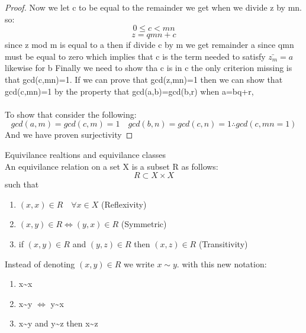 \documentclass[11pt]{article}
\theoremstyle{definition}  %
\begin{document}
\begin{proof}
Now we let c to be equal to the remainder we get when we divide z by mn. so:
\[
  0\leq c <mn
\]
\[
  z=qmn+c
\]
since z mod m is equal to a then if divide c by m we get  remainder a since qmn must be equal to zero which implies that c is the term needed to satisfy $\bar{z_m}=a$ likewise for b
Finally we need to show tha c is in c the only criterion missing is that gcd(c,mn)=1.
If we can prove that gcd(z,mn)=1 then we can show that gcd(c,mn)=1 by the property that gcd(a,b)=gcd(b,r) when a=bq+r,\\\\
To show that consider the following:
\[
  gcd(a,m)=gcd(c,m)=1\quad  gcd(b,n)=gcd(c,n)=1 \therefore gcd(c,mn=1)
\]
And we have proven surjectivity



\end{proof}

 Equivilance realtions and equivilance classes\\
An equivilance relation on a set X is a subset R as follows:
\[
  R\subset X \times X
\]
such that
\begin{enumerate}
  \item $(x,x)\in R \quad \forall x\in X$ (Reflexivity)
  \item $(x,y)\in R \iff (y,x)\in R$ (Symmetric)
  \item if $(x,y)\in R$ and $(y,z)\in R$ then $(x,z)\in R$ (Transitivity)
\end{enumerate}
Instead of denoting $(x,y)\in R$ we write $x\sim y$. with this new notation:
\begin{enumerate}
  \item x\sim x
  \item x\sim y $\iff$ y\sim x
  \item x\sim y and y\sim z then x\sim z
\end{enumerate}
\end{document}
